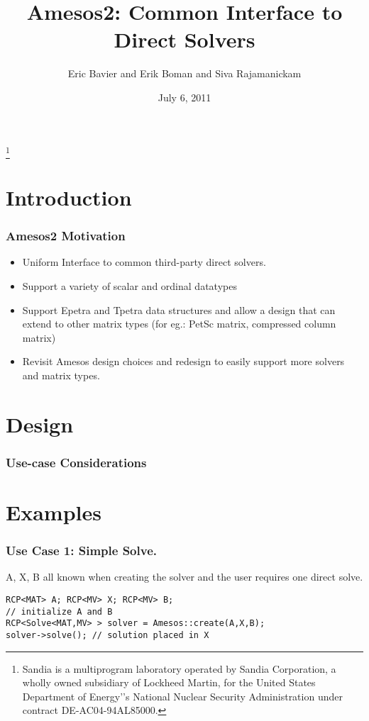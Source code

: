 \documentclass[xcolor=dvipsnames]{beamer}
\title[Amesos2]{Amesos2: Common Interface to Direct Solvers}
\author[Bavier, Boman, Rajamanickam]{Eric Bavier and Erik Boman and Siva Rajamanickam}
\institute[]{
Sandia National Laboratories
}
\date[]{July 6, 2011}
\begin{document}
\begin{frame}[plain]
  \titlepage
  \footnote{\tiny{Sandia is a multiprogram laboratory operated by Sandia Corporation, a wholly owned subsidiary of Lockheed Martin, for the United States Department of Energy'’s National Nuclear Security Administration under contract DE-AC04-94AL85000.}}
\end{frame}

\section{Introduction}

\begin{frame}
  \frametitle{Amesos2 Motivation}
  
  \begin{itemize}
  \item Uniform Interface to common third-party direct solvers.
    \medskip
  \item Support a variety of scalar and ordinal datatypes
    \medskip
  \item Support Epetra and Tpetra data structures and allow a design that can
    extend to other matrix types (for eg.: PetSc matrix, compressed column
    matrix)
    \medskip
  \item Revisit Amesos design choices and redesign to easily support more
    solvers and matrix types.
  \end{itemize}
    
\end{frame}

\section{Design}

\begin{frame}
  \frametitle{Use-case Considerations}
\end{frame}

\section{Examples}

\begin{frame}[fragile]          %
  \frametitle{Use Case 1: Simple Solve.}
  A, X, B all known when creating the solver and the user requires one direct
  solve.
  \begin{lstlisting}
RCP<MAT> A; RCP<MV> X; RCP<MV> B;
// initialize A and B
RCP<Solve<MAT,MV> > solver = Amesos::create(A,X,B);
solver->solve(); // solution placed in X
  \end{lstlisting}
\end{frame}
\end{document}
